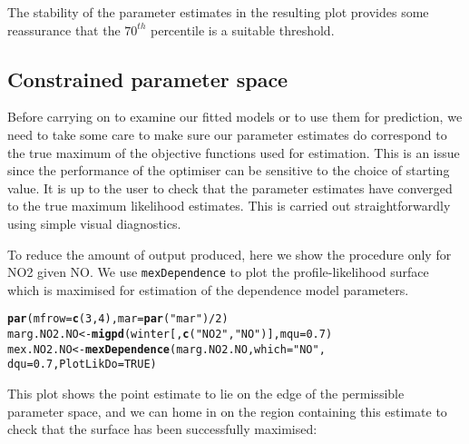 \documentclass[10pt]{article}\usepackage[]{graphicx}\usepackage[]{color}
\makeatletter
\newcommand{\hlnum}[1]{\textcolor[rgb]{0.686,0.059,0.569}{#1}}%
\newcommand{\hlstr}[1]{\textcolor[rgb]{0.192,0.494,0.8}{#1}}%
\newcommand{\hlopt}[1]{\textcolor[rgb]{0,0,0}{#1}}%
\newcommand{\hlstd}[1]{\textcolor[rgb]{0.345,0.345,0.345}{#1}}%
\newcommand{\hlkwb}[1]{\textcolor[rgb]{0.69,0.353,0.396}{#1}}%
\newcommand{\hlkwc}[1]{\textcolor[rgb]{0.333,0.667,0.333}{#1}}%
\newcommand{\hlkwd}[1]{\textcolor[rgb]{0.737,0.353,0.396}{\textbf{#1}}}%
\newenvironment{kframe}{%
 \def\at@end@of@kframe{}%
 \ifinner\ifhmode%
  \def\at@end@of@kframe{\end{minipage}}%
  \begin{minipage}{\columnwidth}%
 \fi\fi%
 \def\FrameCommand##1{\hskip\@totalleftmargin \hskip-\fboxsep
 \colorbox{shadecolor}{##1}\hskip-\fboxsep
     \hskip-\linewidth \hskip-\@totalleftmargin \hskip\columnwidth}%
 \MakeFramed {\advance\hsize-\width
   \@totalleftmargin\z@ \linewidth\hsize
   \@setminipage}}%
 {\par\unskip\endMakeFramed%
 \at@end@of@kframe}
\newenvironment{knitrout}{}{} %
\makeatother
\begin{document}
The stability of the parameter estimates in the resulting plot provides some
reassurance that the $70^{th}$ percentile is a suitable threshold.
%
\subsection{Constrained parameter space}
\label{section:parSpaceConstraints}
%
Before carrying on to examine our fitted models or to use them for prediction,
we need to take some care to make sure our parameter estimates do correspond to
the true maximum of the objective functions used for estimation.  This is an
issue since the performance of the optimiser can be sensitive to the choice of
starting value. It is up to the user to check that the parameter estimates have
converged to the true maximum likelihood estimates.  This is carried out
straightforwardly using simple visual diagnostics.

To reduce the amount of output produced, here we show the procedure only for NO2
given NO.  We use {\tt mexDependence} to plot the profile-likelihood surface
which is maximised for estimation of the dependence model parameters.

\begin{knitrout}
\color{fgcolor}\begin{kframe}
\begin{alltt}
\hlkwd{par}\hlstd{(}\hlkwc{mfrow}\hlstd{=}\hlkwd{c}\hlstd{(}\hlnum{3}\hlstd{,}\hlnum{4}\hlstd{),} \hlkwc{mar}\hlstd{=}\hlkwd{par}\hlstd{(}\hlstr{"mar"}\hlstd{)}\hlopt{/}\hlnum{2}\hlstd{)}
\hlstd{marg.NO2.NO} \hlkwb{<-} \hlkwd{migpd}\hlstd{(winter[,}\hlkwd{c}\hlstd{(}\hlstr{"NO2"}\hlstd{,}\hlstr{"NO"}\hlstd{)],}\hlkwc{mqu}\hlstd{=}\hlnum{0.7}\hlstd{)}
\hlstd{mex.NO2.NO} \hlkwb{<-} \hlkwd{mexDependence}\hlstd{(marg.NO2.NO,} \hlkwc{which} \hlstd{=} \hlstr{"NO"}\hlstd{,}
                            \hlkwc{dqu}\hlstd{=}\hlnum{0.7}\hlstd{,} \hlkwc{PlotLikDo}\hlstd{=}\hlnum{TRUE}\hlstd{)}
\end{alltt}
\end{kframe}
\end{knitrout}

This plot shows the point estimate to lie on the edge of the permissible
parameter space, and we can home in on the region containing this estimate to
check that the surface has been successfully maximised:
\end{document}
